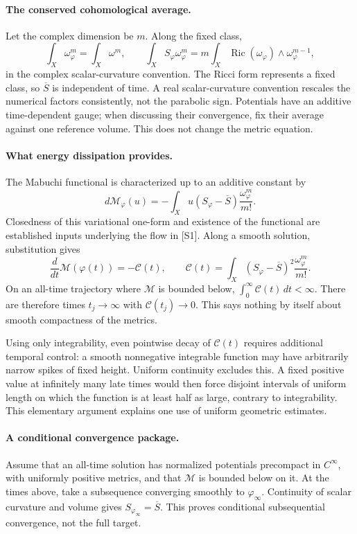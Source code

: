 \documentclass[11pt]{article}
\begin{document}
\paragraph{The conserved cohomological average.}
Let the complex dimension be $m$. Along the fixed class,
\[
 \int_X\omega_\varphi^m=\int_X\omega^m,\qquad
 \int_XS_\varphi\omega_\varphi^m
 =m\int_X\operatorname{Ric}(\omega_\varphi)
                               \wedge\omega_\varphi^{m-1},
\]
in the complex scalar-curvature convention. The Ricci form
represents a fixed class, so $\overline S$ is independent of
time. A real scalar-curvature convention rescales the numerical
factors consistently, not the parabolic sign. Potentials have
an additive time-dependent gauge; when discussing their
convergence, fix their average against one reference volume.
This does not change the metric equation.

\paragraph{What energy dissipation provides.}
The Mabuchi functional is characterized up to an additive
constant by
\[
 d\mathcal M_\varphi(u)
 =-\int_Xu(S_\varphi-\overline S)\frac{\omega_\varphi^m}{m!}.
\]
Closedness of this variational one-form and existence of the
functional are established inputs underlying the flow in
[S1]. Along a smooth solution, substitution gives
\begin{equation}\label{a401:dissipation}
 \frac{d}{dt}\mathcal M(\varphi(t))=-\mathcal C(t),\qquad
 \mathcal C(t)=\int_X(S_\varphi-\overline S)^2
                              \frac{\omega_\varphi^m}{m!}.
\end{equation}
On an all-time trajectory where $\mathcal M$ is bounded
below, $\int_0^\infty\mathcal C(t)\,dt<\infty$.
There are therefore times $t_j\to\infty$ with
$\mathcal C(t_j)\to0$. This says nothing by itself
about smooth compactness of the metrics.

Using only integrability, even pointwise decay of
$\mathcal C(t)$ requires additional temporal control:
a smooth nonnegative integrable function may have
arbitrarily narrow spikes of fixed height. Uniform
continuity excludes this. A fixed positive value
at infinitely many late times would then force
disjoint intervals of uniform length on which
the function is at least half as large, contrary
to integrability. This elementary argument
explains one use of uniform geometric estimates.

\paragraph{A conditional convergence package.}
Assume that an all-time solution has normalized potentials
precompact in $C^\infty$, with uniformly positive metrics,
and that $\mathcal M$ is bounded below on it. At the times
above, take a subsequence converging smoothly to
$\varphi_\infty$. Continuity of scalar curvature and
volume gives $S_{\varphi_\infty}=\overline S$.
This proves conditional subsequential convergence,
not the full target.
\end{document}
